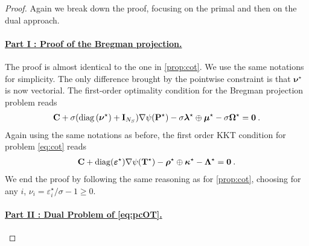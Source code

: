 \begin{proof}
Again we break down the proof, focusing on the primal and then on the dual approach.

\paragraph{\underline{Part I : Proof of the Bregman projection.}}

The proof is almost identical to the one in \cref{prop:cot}. We use the same notations for simplicity. The only difference brought by the pointwise constraint is that $\bm{\nu}^\star$ is now vectorial. The first-order optimality condition for the Bregman projection problem reads
\begin{align}
    {\mathbf{C}} + \sigma (\operatorname{diag}{(\bm{\nu}^\star)} + \mathbf{I}_{N_S}) \nabla \psi({\mathbf{P}}^\star) -  \sigma \bm{\lambda}^\star \oplus \bm{\mu}^\star - \sigma \mathbf{\Omega}^\star= \bm{0} \:.
\end{align}
Again using the same notations as before, the first order KKT condition for problem \eqref{eq:cot} reads
\begin{align}
    {\mathbf{C}} + \operatorname{diag}(\bm{\varepsilon}^\star) \nabla \psi({\mathbf{T}}^\star) -  \bm{\rho}^\star \oplus \bm{\kappa}^{\star} - \mathbf{\Lambda}^\star = \bm{0} \:.
\end{align}
We end the proof by following the same reasoning as for \cref{prop:cot}, choosing for any $i$, $\nu_i = \varepsilon_i^\star / \sigma - 1 \geq 0$.

\paragraph{\underline{Part II : Dual Problem of \eqref{eq:pcOT}.}}


\end{proof}
